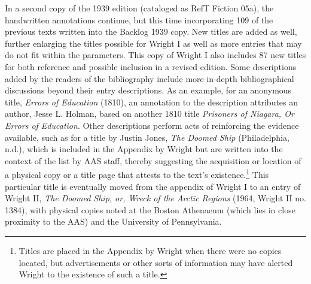 In a second copy of the 1939 edition (cataloged as RefT Fiction 05a), the handwritten annotations continue, but this time incorporating 109 of the previous texts written into the Backlog 1939 copy. New titles are added as well, further enlarging the titles possible for Wright I as well as more entries that may do not fit within the parameters. This copy of Wright I also includes 87 new titles for both reference and possible inclusion in a revised edition. Some descriptions added by the readers of the bibliography  include more in-depth bibliographical discussions beyond their entry descriptions. As an example, for an anonymous title, \textit{Errors of Education} (1810), an annotation to the description attributes an author, Jesse L. Holman, based on another 1810 title \textit{Prisoners of Niagara, Or Errors of Education}. Other descriptions perform acts of reinforcing the evidence available, such as for a title by  Justin Jones, \textit{The Doomed Ship} (Philadelphia, n.d.), which is included in the Appendix by Wright but are written into the context of the list by AAS staff, thereby suggesting the acquisition or location of a physical copy or a title page that attests to the text's existence.\footnote{Titles are placed in the Appendix by Wright when there were no copies located, but advertisements or other sorts of information may have alerted Wright to the existence of such a title.} This particular title is eventually moved from the appendix of Wright I to  an entry of Wright II, \textit{The Doomed Ship, or, Wreck of the Arctic Regions} (1964, Wright II no. 1384), with physical copies noted at the Boston Athenaeum (which lies in close proximity to the AAS) and the University of Pennsylvania.\autocite[186]{wright_american_1957} 


